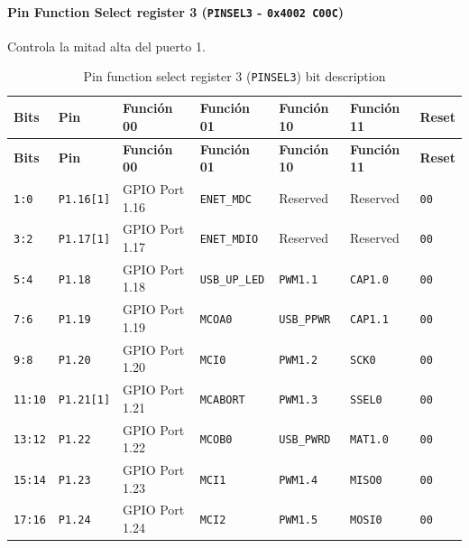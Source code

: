 \paragraph{Pin Function Select register 3 (\texttt{PINSEL3} - \texttt{0x4002 C00C})}
Controla la mitad alta del puerto 1.

\begin{longtable}{|>{\raggedright\arraybackslash}p{}|>{\raggedright\arraybackslash}p{}|>{\raggedright\arraybackslash}p{}|>{\raggedright\arraybackslash}p{}|>{\raggedright\arraybackslash}p{}|>{\raggedright\arraybackslash}p{}|>{\centering\arraybackslash}p{}|}
\caption{Pin function select register 3 (\texttt{PINSEL3}) bit description}\\
\hline
\textbf{Bits} & \textbf{Pin} & \textbf{Función 00} & \textbf{Función 01} & \textbf{Función 10} & \textbf{Función 11} & \textbf{Reset} \\
\hline
\endfirsthead
\hline
\textbf{Bits} & \textbf{Pin} & \textbf{Función 00} & \textbf{Función 01} & \textbf{Función 10} & \textbf{Función 11} & \textbf{Reset} \\
\hline
\endhead
\texttt{1:0} & \texttt{P1.16[1]} & GPIO Port 1.16 & \texttt{ENET\_MDC} & Reserved & Reserved & \texttt{00} \\
\hline
\texttt{3:2} & \texttt{P1.17[1]} & GPIO Port 1.17 & \texttt{ENET\_MDIO} & Reserved & Reserved & \texttt{00} \\
\hline
\texttt{5:4} & \texttt{P1.18} & GPIO Port 1.18 & \texttt{USB\_UP\_LED} & \texttt{PWM1.1} & \texttt{CAP1.0} & \texttt{00} \\
\hline
\texttt{7:6} & \texttt{P1.19} & GPIO Port 1.19 & \texttt{MCOA0} & \texttt{USB\_PPWR} & \texttt{CAP1.1} & \texttt{00} \\
\hline
\texttt{9:8} & \texttt{P1.20} & GPIO Port 1.20 & \texttt{MCI0} & \texttt{PWM1.2} & \texttt{SCK0} & \texttt{00} \\
\hline
\texttt{11:10} & \texttt{P1.21[1]} & GPIO Port 1.21 & \texttt{MCABORT} & \texttt{PWM1.3} & \texttt{SSEL0} & \texttt{00} \\
\hline
\texttt{13:12} & \texttt{P1.22} & GPIO Port 1.22 & \texttt{MCOB0} & \texttt{USB\_PWRD} & \texttt{MAT1.0} & \texttt{00} \\
\hline
\texttt{15:14} & \texttt{P1.23} & GPIO Port 1.23 & \texttt{MCI1} & \texttt{PWM1.4} & \texttt{MISO0} & \texttt{00} \\
\hline
\texttt{17:16} & \texttt{P1.24} & GPIO Port 1.24 & \texttt{MCI2} & \texttt{PWM1.5} & \texttt{MOSI0} & \texttt{00} \\

\end{longtable}
